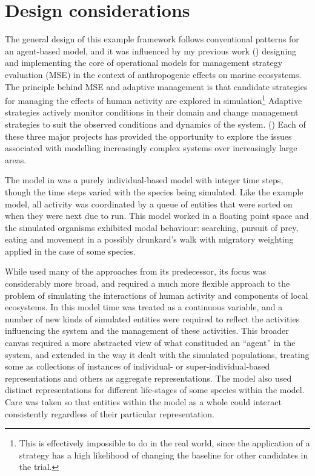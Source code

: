 \section{Design considerations}
The general design of this example framework follows conventional
patterns for an agent-based model, and it was influenced by my
previous work (\cite{lyne1994pmez5, gray2006nws, gray2014}) designing
and implementing the core of operational models for management
strategy evaluation (MSE) in the context of anthropogenic effects on
marine ecosystems.  The principle behind MSE and adaptive management
is that candidate strategies for managing the effects of human
activity are explored in simulation\footnote{This is effectively
  impossible to do in the real world, since the application of a
  strategy has a high likelihood of changing the baseline for other
  candidates in the trial.} Adaptive strategies actively monitor
conditions in their domain and change management strategies to suit
the observed conditions and dynamics of the
system. (\cite{walters1976,smith1993,polacheck1999,sainsbury2000,keith2011})
Each of these three major projects has provided the opportunity to
explore the issues associated with modelling increasingly complex
systems over increasingly large areas.

The model in \cite{lyne1994pmez5} was a purely individual-based model
with integer time steps, though the time steps varied with the species
being simulated. Like the example model, all activity was coordinated
by a queue of entities that were sorted on when they were next due to
run. This model worked in a floating point space and the simulated
organisms exhibited modal behaviour: searching, pursuit of prey,
eating and movement in a possibly drunkard's walk with migratory
weighting applied in the case of some species.

While \cite{gray2006nws} used many of the approaches from its
predecessor, its focus was considerably more broad, and required a
much more flexible approach to the problem of simulating the
interactions of human activity and components of local ecosystems. In
this model time was treated as a continuous variable, and a number of
new kinds of simulated entities were required to reflect the
activities influencing the system and the management of these
activities. This broader canvas required a more abstracted view of
what constituded an ``agent'' in the system, and extended
\cite{lyne1994pmez5} in the way it dealt with the simulated
populations, treating some as collections of instances of individual-
or super-individual-based representations and others as aggregate
representations.  The model also used distinct representations for
different life-stages of some species within the model.  Care was
taken so that entities within the model as a whole could interact
consistently regardless of their particular representation.

